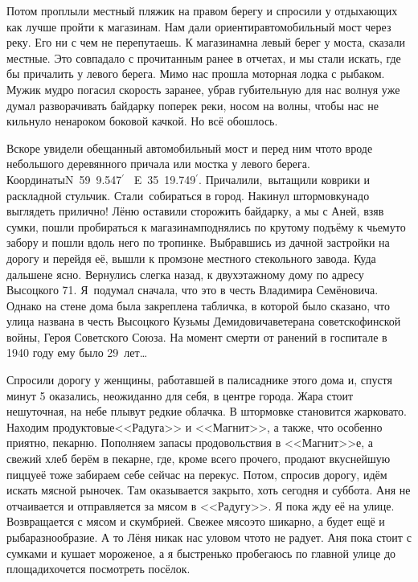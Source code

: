 Потом проплыли местный пляжик на правом берегу и спросили у отдыхающих как лучше пройти к магазинам. Нам дали ориентир\mdash автомобильный мост через реку. Его ни с чем не перепутаешь. К магазинам\mdash на левый берег у моста, сказали местные. Это совпадало с прочитанным ранее в отчетах, и мы стали искать, где бы причалить у левого берега. Мимо нас прошла моторная лодка с рыбаком. Мужик мудро погасил скорость заранее, убрав губительную для нас волну\mdash я уже думал разворачивать байдарку поперек реки, носом на волны, чтобы нас не кильнуло ненароком боковой качкой. Но всё обошлось. 

Вскоре увидели обещанный автомобильный мост и перед ним что\sdash то вроде небольшого деревянного причала или мостка у левого берега. Координаты\mdash N~59\degree~9.547$^\prime$~ E~35\degree~19.749$^\prime$. Причалили,~вытащили коврики и раскладной стульчик. Стали~собираться в город. Накинул штормовку\mdash надо выглядеть прилично! Лёню оставили сторожить байдарку, а мы с Аней, взяв сумки, пошли пробираться к магазинам\mdash поднялись по крутому подъёму к чьему\sdash то забору и пошли вдоль него по тропинке. Выбравшись из дачной застройки на дорогу и перейдя её, вышли к промзоне местного стекольного завода. Куда дальше\mdash не ясно. Вернулись слегка назад, к двухэтажному дому по адресу Высоцкого 71. Я~подумал сначала, что это в честь Владимира Семёновича. Однако на стене дома была закреплена табличка, в которой было сказано, что улица названа в честь Высоцкого Кузьмы Демидовича\mdash ветерана советско\sdash финской войны, Героя Советского Союза. На момент смерти от ранений в госпитале в 1940 году ему было 29~лет\ldots 

Спросили дорогу у женщины, работавшей в палисаднике этого дома и, спустя минут 5 оказались, неожиданно для себя, в центре города. Жара стоит нешуточная, на небе плывут редкие облачка. В штормовке становится жарковато. Находим продуктовые\mdash <<Радуга>> и <<Магнит>>, а также, что особенно приятно, пекарню. Пополняем запасы продовольствия в <<Магнит>>\sdash е, а свежий хлеб берём в пекарне, где, кроме всего прочего, продают вкуснейшую пиццу\mdash её тоже забираем себе сейчас на перекус. Потом, спросив дорогу, идём искать мясной рыночек. Там оказывается закрыто, хоть сегодня и суббота. Аня не отчаивается и отправляется за мясом в <<Радугу>>. Я пока жду её на улице. Возвращается с мясом и скумбрией. Свежее мясо\mdash это шикарно, а будет ещё и рыба\mdash разнообразие. А то Лёня никак нас уловом что\sdash то не радует. Аня пока стоит с сумками и кушает мороженое, а я быстренько пробегаюсь по главной улице до площади\mdash хочется посмотреть посёлок.

